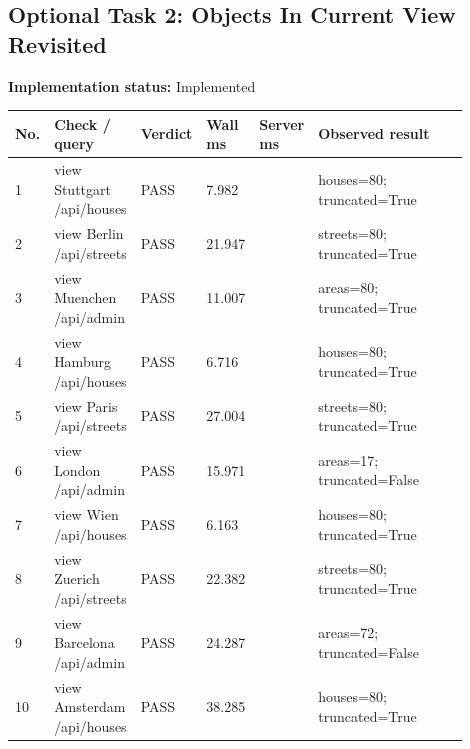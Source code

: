 \documentclass[10pt,a4paper]{article}
\begin{document}
\subsection{Optional Task 2: Objects In Current View Revisited}
\textbf{Implementation status:} Implemented\\
\scriptsize
\begin{longtable}{|P{0.045\linewidth}|P{0.19\linewidth}|P{0.105\linewidth}|P{0.085\linewidth}|P{0.085\linewidth}|P{0.385\linewidth}|}
\hline
\textbf{No.} & \textbf{Check / query} & \textbf{Verdict} & \textbf{Wall ms} & \textbf{Server ms} & \textbf{Observed result}\\ \hline
{} 1 & view Stuttgart /api/houses & PASS & 7.982 &  & houses=80; truncated=True\\ \hline
{} 2 & view Berlin /api/streets & PASS & 21.947 &  & streets=80; truncated=True\\ \hline
{} 3 & view Muenchen /api/admin & PASS & 11.007 &  & areas=80; truncated=True\\ \hline
{} 4 & view Hamburg /api/houses & PASS & 6.716 &  & houses=80; truncated=True\\ \hline
{} 5 & view Paris /api/streets & PASS & 27.004 &  & streets=80; truncated=True\\ \hline
{} 6 & view London /api/admin & PASS & 15.971 &  & areas=17; truncated=False\\ \hline
{} 7 & view Wien /api/houses & PASS & 6.163 &  & houses=80; truncated=True\\ \hline
{} 8 & view Zuerich /api/streets & PASS & 22.382 &  & streets=80; truncated=True\\ \hline
{} 9 & view Barcelona /api/admin & PASS & 24.287 &  & areas=72; truncated=False\\ \hline
{} 10 & view Amsterdam /api/houses & PASS & 38.285 &  & houses=80; truncated=True\\ \hline
\end{longtable}
\normalsize
\end{document}
